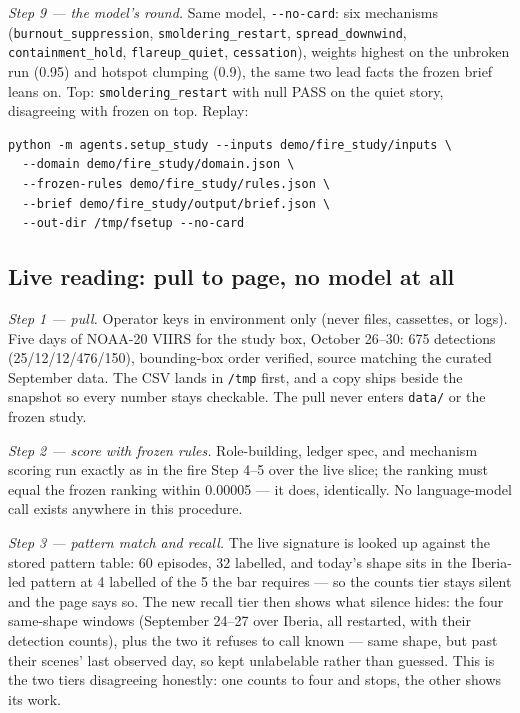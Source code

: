 \documentclass[11pt]{article}
\begin{document}
{\sloppy{}
\emph{Step 9 --- the model's round.} Same model, \verb|--no-card|: six mechanisms (\verb|burnout_suppression|, \verb|smoldering_restart|, \verb|spread_downwind|, \verb|containment_hold|, \verb|flareup_quiet|, \verb|cessation|), weights highest on the unbroken run (0.95) and hotspot clumping (0.9), the same two lead facts the frozen brief leans on. Top: \verb|smoldering_restart| with null PASS on the quiet story, disagreeing with frozen on top. Replay:
\par}
{\footnotesize
\begin{verbatim}
python -m agents.setup_study --inputs demo/fire_study/inputs \
  --domain demo/fire_study/domain.json \
  --frozen-rules demo/fire_study/rules.json \
  --brief demo/fire_study/output/brief.json \
  --out-dir /tmp/fsetup --no-card
\end{verbatim}
}

\subsection{Live reading: pull to page, no model at all}

\emph{Step 1 --- pull.} Operator keys in environment only (never files,
cassettes, or logs). Five days of NOAA-20 VIIRS for the study box, October
26--30: 675 detections (25/12/12/476/150), bounding-box order verified, source
matching the curated September data. The CSV lands in \verb|/tmp| first, and
a copy ships beside the snapshot so every number stays checkable. The pull
never enters \verb|data/| or the frozen study.

\emph{Step 2 --- score with frozen rules.} Role-building, ledger spec, and
mechanism scoring run exactly as in the fire Step 4--5 over the live slice;
the ranking must equal the frozen ranking within 0.00005 --- it does,
identically. No language-model call exists anywhere in this procedure.

\emph{Step 3 --- pattern match and recall.} The live signature is looked up
against the stored pattern table: 60 episodes, 32 labelled, and today's
shape sits in the Iberia-led pattern at 4 labelled of the 5 the bar
requires --- so the counts tier stays silent and the page says so. The new
recall tier then shows what silence hides: the four same-shape windows
(September 24--27 over Iberia, all restarted, with their detection counts),
plus the two it refuses to call known --- same shape, but past their
scenes' last observed day, so kept unlabelable rather than guessed. This is
the two tiers disagreeing honestly: one counts to four and stops, the other
shows its work.
\end{document}
